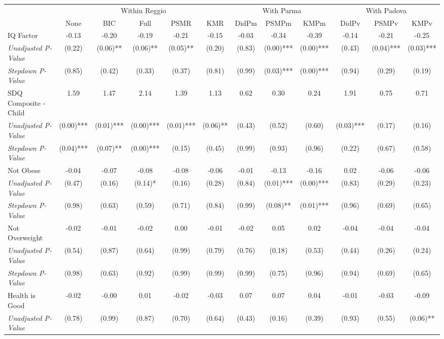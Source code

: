 \begin{tabular}{l c c c c c c c c c c c}
\toprule
& \multicolumn{5}{c}{Within Reggio} & \multicolumn{3}{c}{With Parma} & \multicolumn{3}{c}{With Padova} \\\cmidrule(lr){2-6} \cmidrule(lr){7-9} \cmidrule(lr){10-12}
 & None & BIC & Full & PSMR & KMR & DidPm & PSMPm & KMPm & DidPv & PSMPv & KMPv \\
\midrule
IQ Factor & -0.13 & -0.20 & -0.19 & -0.21 & -0.15 & -0.03 & -0.34 & -0.39 & -0.14 & -0.21 & -0.25 \\
\quad \textit{Unadjusted P-Value} & (0.22) & (0.06)** & (0.06)** & (0.05)** & (0.20) & (0.83) & (0.00)*** & (0.00)*** & (0.43) & (0.04)*** & (0.03)*** \\
\quad \textit{Stepdown P-Value} & (0.85) & (0.42) & (0.33) & (0.37) & (0.81) & (0.99) & (0.03)*** & (0.00)*** & (0.94) & (0.29) & (0.19) \\
SDQ Composite - Child & 1.59 & 1.47 & 2.14 & 1.39 & 1.13 & 0.62 & 0.30 & 0.24 & 1.91 & 0.75 & 0.71 \\
\quad \textit{Unadjusted P-Value} & (0.00)*** & (0.01)*** & (0.00)*** & (0.01)*** & (0.06)** & (0.43) & (0.52) & (0.60) & (0.03)*** & (0.17) & (0.16) \\
\quad \textit{Stepdown P-Value} & (0.04)*** & (0.07)** & (0.00)*** & (0.15) & (0.45) & (0.99) & (0.93) & (0.96) & (0.22) & (0.67) & (0.58) \\
Not Obese & -0.04 & -0.07 & -0.08 & -0.08 & -0.06 & -0.01 & -0.13 & -0.16 & 0.02 & -0.06 & -0.06 \\
\quad \textit{Unadjusted P-Value} & (0.47) & (0.16) & (0.14)* & (0.16) & (0.28) & (0.84) & (0.01)*** & (0.00)*** & (0.83) & (0.29) & (0.23) \\
\quad \textit{Stepdown P-Value} & (0.98) & (0.63) & (0.59) & (0.71) & (0.84) & (0.99) & (0.08)** & (0.01)*** & (0.96) & (0.69) & (0.65) \\
Not Overweight & -0.02 & -0.01 & -0.02 & 0.00 & -0.01 & -0.02 & 0.05 & 0.02 & -0.04 & -0.04 & -0.04 \\
\quad \textit{Unadjusted P-Value} & (0.54) & (0.87) & (0.64) & (0.99) & (0.79) & (0.76) & (0.18) & (0.53) & (0.44) & (0.26) & (0.24) \\
\quad \textit{Stepdown P-Value} & (0.98) & (0.63) & (0.92) & (0.99) & (0.99) & (0.99) & (0.75) & (0.96) & (0.94) & (0.69) & (0.65) \\
Health is Good & -0.02 & -0.00 & 0.01 & -0.02 & -0.03 & 0.07 & 0.07 & 0.04 & -0.01 & -0.03 & -0.09 \\
\quad \textit{Unadjusted P-Value} & (0.78) & (0.99) & (0.87) & (0.70) & (0.64) & (0.43) & (0.16) & (0.39) & (0.93) & (0.55) & (0.06)** \\

\end{tabular}
